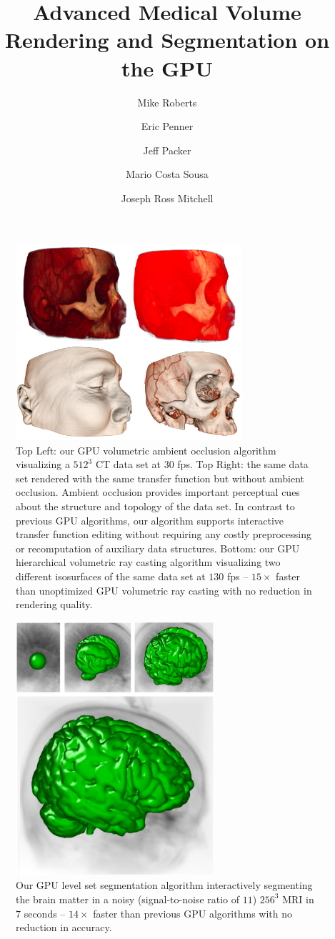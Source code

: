 \documentclass[annualconference]{acmsiggraph}  %
\title{Advanced Medical Volume Rendering and Segmentation on the GPU}
\author{Mike Roberts \and Eric Penner \and Jeff Packer \and Mario Costa Sousa \and Joseph Ross Mitchell }
\affiliation{Hotchkiss Brain Institute, University of Calgary, Canada}
\begin{document}
\maketitle

\begin{figure}[t]
\centering
\includegraphics[width=3.3in]{figures/Eric-Composite.png}
  \caption{ Top Left: our GPU volumetric ambient occlusion algorithm visualizing a $512^3 $ CT data set at $30$ fps. Top Right: the same data set rendered with the same transfer function but without ambient occlusion. Ambient occlusion provides important perceptual cues about the structure and topology of the data set. In contrast to previous GPU algorithms, our algorithm supports interactive transfer function editing without requiring any costly preprocessing or  recomputation of auxiliary data structures. Bottom: our GPU hierarchical volumetric ray casting algorithm visualizing two different isosurfaces of the same data set at $130$ fps -- $15\times$ faster than unoptimized GPU volumetric ray casting with no reduction in rendering quality.}
\label{fig:visualization}
\end{figure}


\begin{figure}[t]
\centering
\includegraphics[width=2.9in]{figures/Brainweb-3D-Composite-Offset.png}
  \caption{ Our GPU level set segmentation algorithm interactively segmenting the brain matter in a noisy (signal-to-noise ratio of $11$) $256^3$ MRI in $7$ seconds -- $14 \times$ faster than previous GPU algorithms with no reduction in accuracy. }
\label{fig:segmentation}
\end{figure}
\end{document}
